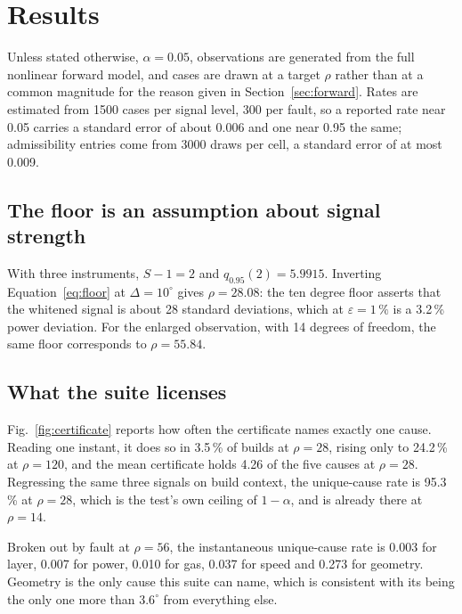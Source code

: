\documentclass[preprint,12pt]{elsarticle}
\begin{document}
\section{Results}
\label{sec:results}

Unless stated otherwise, $\alpha = 0.05$, observations are generated from the
full nonlinear forward model, and cases are drawn at a target $\rho$ rather than
at a common magnitude for the reason given in Section~\ref{sec:forward}. Rates
are estimated from 1500 cases per signal level, 300 per fault, so a reported
rate near 0.05 carries a standard error of about 0.006 and one near 0.95 the
same; admissibility entries come from 3000 draws per cell, a standard error of
at most 0.009.

\subsection{The floor is an assumption about signal strength}
\label{sec:floorresult}

With three instruments, $S-1 = 2$ and $q_{0.95}(2) = 5.9915$. Inverting
Equation~\eqref{eq:floor} at $\Delta = 10^\circ$ gives $\rho = 28.08$: the ten
degree floor asserts that the whitened signal is about 28 standard deviations,
which at $\varepsilon = 1\,\%$ is a 3.2\,\% power deviation. For the enlarged
observation, with 14 degrees of freedom, the same floor corresponds to
$\rho = 55.84$.

\subsection{What the suite licenses}
\label{sec:size}

Fig.~\ref{fig:certificate} reports how often the certificate names exactly one
cause. Reading one instant, it does so in 3.5\,\% of builds at $\rho = 28$,
rising only to 24.2\,\% at $\rho = 120$, and the mean certificate holds 4.26 of
the five causes at $\rho = 28$. Regressing the same three signals on build
context, the unique-cause rate is 95.3\,\% at $\rho = 28$, which is the test's
own ceiling of $1 - \alpha$, and is already there at $\rho = 14$.

Broken out by fault at $\rho = 56$, the instantaneous unique-cause rate is
0.003 for layer, 0.007 for power, 0.010 for gas, 0.037 for speed and 0.273 for
geometry. Geometry is the only cause this suite can name, which is consistent
with its being the only one more than $3.6^\circ$ from everything else.
\end{document}
